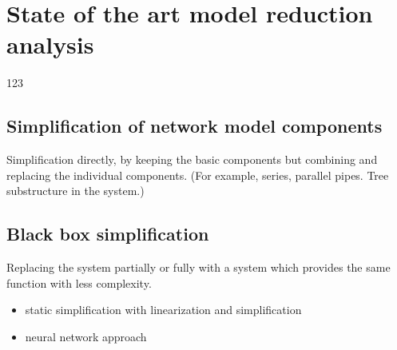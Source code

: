 \section{State of the art model reduction analysis}
\label{state_of_the_art_model_reduction_analysis}

123

\subsection{Simplification of network model components}
\label{simplification of network model components}

Simplification directly, by keeping the basic components but combining and replacing the individual components. (For example, series, parallel pipes. Tree substructure in the system.)

\subsection{Black box simplification}
\label{black_box_simplification}

Replacing the system partially or fully with a system which provides the same function with less complexity. 

\begin{itemize}
  \item static simplification with linearization and simplification
  \item neural network approach 
\end{itemize}























